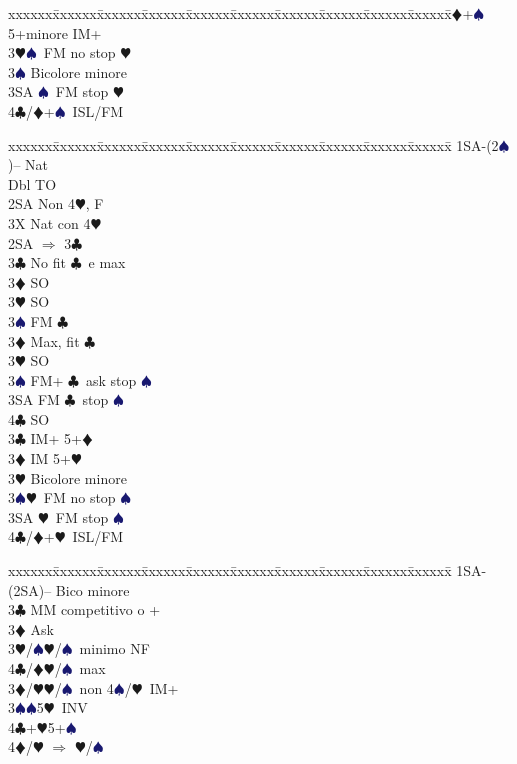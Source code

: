\documentclass[a4paper,italian]{article}
\newcommand{\BC}{\textcolor{OliveGreen}{$\clubsuit$}}
\newcommand{\BD}{\textcolor{RedOrange}{$\vardiamondsuit$}}
\newcommand{\BH}{\textcolor{Red2}{$\varheartsuit${}}}
\newcommand{\BS}{\textcolor{MidnightBlue}{$\spadesuit${}}}
\newenvironment{bidtable}
{\begin{tabbing}

    xxxxxx\=xxxxxx\=xxxxxx\=xxxxxx\=xxxxxx\=xxxxxx\=xxxxxx\=xxxxxx\=xxxxxx\=xxxxxx\=\kill}
{\end{tabbing} }%
\begin{document}
\begin{multicols}{2}
\begin{bidtable}
        3\BD {}+\BS 5+minore IM+\\
        3\BH {}\BS\ FM no stop \BH \\
        3\BS \> Bicolore minore\\
        3SA \BS\ FM stop \BH \\
        4\BC/\BD {}+\BS\ ISL/FM\-
    \end{bidtable}
    \begin{bidtable}
        1SA-(2\BS)-- \> \> Nat\+\\
        Dbl \> TO\+\\
        2SA \> Non 4\BH, F\\
        3X \> Nat con 4\BH\-\\
        2SA \> $\Rightarrow$ 3\BC \+\\
        3\BC \> No fit \BC\ e max\+\\
        3\BD \> SO\\
        3\BH \> SO\\
        3\BS \> FM \BC \-\\
        3\BD \> Max, fit \BC \+\\
        3\BH \> SO\\
        3\BS \> FM+ \BC\ ask stop \BS \\
        3SA \> FM \BC\ stop \BS \\
        4\BC \> SO\-\-\\
        3\BC \> IM+ 5+\BD \\
        3\BD \> IM 5+\BH \\
        3\BH \> Bicolore minore\\
        3\BS {}\BH\ FM no stop \BS \\
        3SA \BH\ FM stop \BS \\
        4\BC/\BD {}+\BH\ ISL/FM\-
    \end{bidtable}
    \begin{bidtable}
        1SA-(2SA)-- \>\> Bico minore\+\\
        3\BC {} MM competitivo o +\+\\
        3\BD \> Ask\+\\
        3\BH/\BS {}\BH /\BS\ minimo NF\\
        4\BC/\BD {}\BH /\BS\ max\-\-\\
        3\BD/\BH {}\BH /\BS\ non 4\BS/\BH\ IM+\\
        3\BS {}\BS5\BH\ INV\\
        4\BC {}+\BH 5+\BS \\
        4\BD/\BH \> $\Rightarrow$ \BH /\BS \-
    \end{bidtable}
    \vfill\null
    \columnbreak


\end{multicols}
\end{document}

